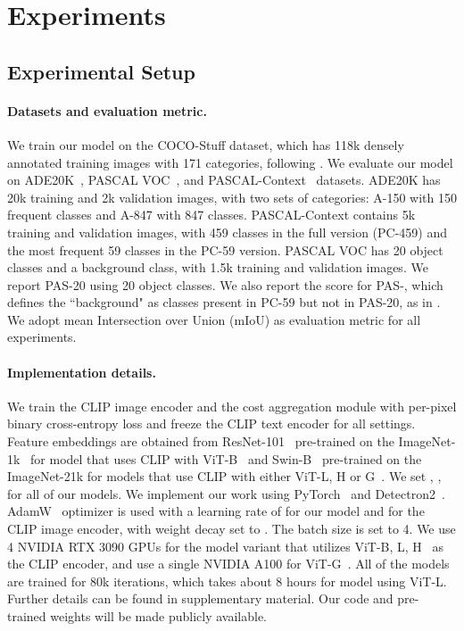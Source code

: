 \documentclass[10pt,twocolumn,letterpaper]{article}
\begin{document}
\section{Experiments}
\subsection{Experimental Setup}
\paragraph{Datasets and evaluation metric.} 
We train our model on the COCO-Stuff dataset, which has 118k densely annotated training images with 171 categories, following \cite{liang2022open}. We evaluate our model on ADE20K~\cite{zhou2019semantic}, PASCAL VOC~\cite{everingham2009pascal}, and PASCAL-Context~\cite{mottaghi2014role} datasets. ADE20K has 20k training and 2k validation images, with two sets of categories: A-150 with 150 frequent classes and A-847 with 847 classes. PASCAL-Context contains 5k training and validation images, with 459 classes in the full version (PC-459) and the most frequent 59 classes in the PC-59 version. PASCAL VOC has 20 object classes and a background class, with 1.5k training and validation images. We report PAS-20 using 20 object classes. We also report the score for PAS-, which defines the ``background" as classes present in PC-59 but not in PAS-20, as in \cite{ghiasi2022scaling}. We adopt mean Intersection over Union (mIoU) as evaluation metric for all experiments.

\vspace{-10pt}
\paragraph{Implementation details.}
We train the CLIP image encoder and the cost aggregation module with per-pixel binary cross-entropy loss and freeze the CLIP text encoder for all settings.
Feature embeddings  are obtained from ResNet-101~\cite{he2016deep} pre-trained on the ImageNet-1k~\cite{deng2009imagenet} for model that uses CLIP with ViT-B~\cite{dosovitskiy2020image} and Swin-B~\cite{liu2021swin} pre-trained on the ImageNet-21k for models that use CLIP with either ViT-L, H or G~\cite{zhai2022scaling}.
We set , ,  for all of our models.
We implement our work using PyTorch~\cite{paszke2019pytorch} and Detectron2~\cite{wu2019detectron2}. AdamW~\cite{loshchilov2017decoupled} 
optimizer is used with a learning rate of  for our model  and  for the CLIP image encoder, with weight decay set to . The batch size is set to 4. We use 4 NVIDIA RTX 3090 GPUs for the model variant that utilizes ViT-B, L, H~\cite{dosovitskiy2020image} as the CLIP encoder, and use a single NVIDIA A100 for ViT-G~\cite{zhai2022scaling}. All of the models are trained for 80k iterations, which takes about 8 hours for model using ViT-L. Further details can be found in supplementary material. Our code and pre-trained weights will be made publicly available.
\end{document}
